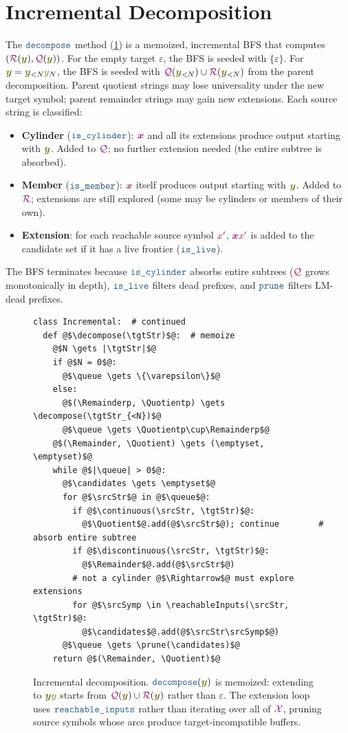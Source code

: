 \documentclass{article}
\theoremstyle{plain}
\newcommand{\Quotient}{{\color{TokenColor}\mathcal{Q}}}
\newcommand{\Remainder}{{\color{TokenColor}\mathcal{R}}}
\newcommand{\Quotientp}{\Quotient'}
\newcommand{\Remainderp}{\Remainder'}
\newcommand{\srcSymp}{{\color{TokenColor}x^\prime}}
\newcommand{\srcStr}{\ensuremath{{\color{TokenColor}\boldsymbol{x}}}\xspace}
\newcommand{\tgtSym}{{\color{CharacterColor}y}}
\newcommand{\tgtStr}{{\color{CharacterColor}\boldsymbol{y}}}
\newcommand{\srcAlphabet}[0]{{\color{TokenColor}\ensuremath{\mathcal{X}}}\xspace}
\newcommand{\queue}[0]{\texttt{q}}
\newcommand{\candidates}[0]{\texttt{C}}
\newcommand{\myMintedFunc}[1]{\mbox{\texttt{{\color{StormBlue}#1}}}}
\newcommand{\continuous}[0]{\myMintedFunc{is\_cylinder}}
\newcommand{\discontinuous}[0]{\myMintedFunc{is\_member}}
\newcommand{\candidate}[0]{\myMintedFunc{is\_live}}
\newcommand{\prune}[0]{\myMintedFunc{prune}}
\newcommand{\decompose}[0]{\myMintedFunc{decompose}}
\newcommand{\reachableInputs}[0]{\myMintedFunc{reachable\_inputs}}
\begin{document}
\section{Incremental Decomposition}
\label{sec:decompose}

The $\decompose$ method (\cref{fig:decompose}) is a memoized, incremental BFS
that computes $(\Remainder(\tgtStr), \Quotient(\tgtStr))$.
For the empty target $\varepsilon$, the BFS is seeded with $\{\varepsilon\}$.
For $\tgtStr = \tgtStr_{<N}\tgtSym_N$, the BFS is seeded with
$\Quotient(\tgtStr_{<N}) \cup \Remainder(\tgtStr_{<N})$ from the parent
decomposition.
Parent quotient strings may lose universality under the new target symbol;
parent remainder strings may gain new extensions.
Each source string is classified:
\begin{itemize}
\item \textbf{Cylinder} ($\continuous$): $\srcStr$ and all its extensions
  produce output starting with $\tgtStr$.  Added to $\Quotient$;
  no further extension needed (the entire subtree is absorbed).
\item \textbf{Member} ($\discontinuous$): $\srcStr$ itself produces output
  starting with $\tgtStr$.  Added to $\Remainder$; extensions are still
  explored (some may be cylinders or members of their own).
\item \textbf{Extension}: for each reachable source symbol $\srcSymp$,
  $\srcStr\srcSymp$ is added to the candidate set if it has a live frontier
  ($\candidate$).
\end{itemize}
The BFS terminates because $\continuous$ absorbs entire subtrees ($\Quotient$
grows monotonically in depth), $\candidate$ filters dead prefixes, and $\prune$
filters LM-dead prefixes.

\begin{figure}[H]
\centering
\begin{verbatim}
class Incremental:  # continued
  def @$\decompose(\tgtStr)$@:  # memoize
    @$N \gets |\tgtStr|$@
    if @$N = 0$@:
      @$\queue \gets \{\varepsilon\}$@
    else:
      @$(\Remainderp, \Quotientp) \gets \decompose(\tgtStr_{<N})$@
      @$\queue \gets \Quotientp\cup\Remainderp$@
    @$(\Remainder, \Quotient) \gets (\emptyset, \emptyset)$@
    while @$|\queue| > 0$@:
      @$\candidates \gets \emptyset$@
      for @$\srcStr$@ in @$\queue$@:
        if @$\continuous(\srcStr, \tgtStr)$@:
          @$\Quotient$@.add(@$\srcStr$@); continue        # absorb entire subtree
        if @$\discontinuous(\srcStr, \tgtStr)$@:
          @$\Remainder$@.add(@$\srcStr$@)
        # not a cylinder @$\Rightarrow$@ must explore extensions
        for @$\srcSymp \in \reachableInputs(\srcStr, \tgtStr)$@:
          @$\candidates$@.add(@$\srcStr\srcSymp$@)
      @$\queue \gets \prune(\candidates)$@
    return @$(\Remainder, \Quotient)$@
\end{verbatim}
\caption{Incremental decomposition.
$\decompose(\tgtStr)$ is memoized: extending to $\tgtStr\tgtSym$ starts from
$\Quotient(\tgtStr) \cup \Remainder(\tgtStr)$ rather than $\varepsilon$.
The extension loop uses $\reachableInputs$ rather than iterating over all of
$\srcAlphabet$, pruning source symbols whose arcs produce target-incompatible
buffers.}
\label{fig:decompose}
\end{figure}
\end{document}
